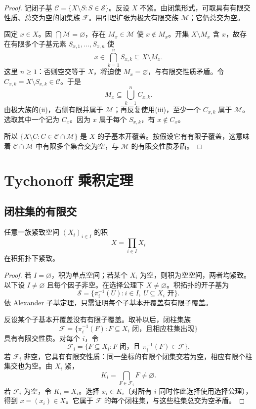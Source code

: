\begin{proof}
记闭子基 \(\mathcal C=\{X\setminus S:S\in\mathcal S\}\)。反设 \(X\) 不紧。由闭集形式，可取具有有限交性质、总交为空的闭集族 \(\mathcal F\)。用引理扩张为极大有限交族 \(\mathcal M\)；它仍总交为空。

固定 \(x\in X\)。因 \(\bigcap\mathcal M=\varnothing\)，存在 \(M_x\in\mathcal M\) 使 \(x\notin M_x\)。开集 \(X\setminus M_x\) 含 \(x\)，故存在有限多个子基元素 \(S_{x,1},\ldots,S_{x,n}\) 使
\[
 x\in\bigcap_{k=1}^nS_{x,k}\subseteq X\setminus M_x.
\]
这里 \(n\ge1\)：否则空交等于 \(X\)，将迫使 \(M_x=\varnothing\)，与有限交性质矛盾。令 \(C_{x,k}=X\setminus S_{x,k}\in\mathcal C\)。于是
\[
 M_x\subseteq\bigcup_{k=1}^nC_{x,k}.
\]
由极大族的(ii)，右侧有限并属于 \(\mathcal M\)；再反复使用(iii)，至少一个 \(C_{x,k}\) 属于 \(\mathcal M\)。选取其中一个记为 \(C_x\)。因为 \(x\) 属于每个 \(S_{x,k}\)，有 \(x\notin C_x\)。

所以 \(\{X\setminus C:C\in\mathcal C\cap\mathcal M\}\) 是 \(X\) 的子基本开覆盖。按假设它有有限子覆盖，这意味着 \(\mathcal C\cap\mathcal M\) 中有限多个集合交为空，与 \(\mathcal M\) 的有限交性质矛盾。
\end{proof}

\section{Tychonoff 乘积定理}

\subsection{闭柱集的有限交}

\begin{theorem}
\label{thm:tychonoff-product}
任意一族紧致空间 \((X_i)_{i\in I}\) 的积
\[
 X=\prod_{i\in I}X_i
\]
在积拓扑下紧致。
\end{theorem}

\begin{proof}
若 \(I=\varnothing\)，积为单点空间；若某个 \(X_i\) 为空，则积为空空间，两者均紧致。以下设 \(I\ne\varnothing\) 且每个因子非空。在选择公理下 \(X\ne\varnothing\)。积拓扑的开子基为
\[
 \mathcal S=\{\pi_i^{-1}(U):i\in I,\ U\subseteq X_i\text{ 开}\}.
\]
依 Alexander 子基定理，只需证明每个子基本开覆盖有有限子覆盖。

反设某个子基本开覆盖没有有限子覆盖。取补以后，闭柱集族
\[
 \mathcal F=\{\pi_i^{-1}(F):F\subseteq X_i\text{ 闭，且相应柱集出现}\}
\]
具有有限交性质。对每个 \(i\)，令
\[
 \mathcal F_i=\{F\subseteq X_i:F\text{ 闭，且 }\pi_i^{-1}(F)\in\mathcal F\}.
\]
若 \(\mathcal F_i\) 非空，它具有有限交性质：同一坐标的有限个闭集交若为空，相应有限个柱集交也为空。由 \(X_i\) 紧，
\[
 K_i=\bigcap_{F\in\mathcal F_i}F\ne\varnothing.
\]
若 \(\mathcal F_i\) 为空，令 \(K_i=X_i\)。选择 \(x_i\in K_i\)（对所有 \(i\) 同时作此选择使用选择公理），得到 \(x=(x_i)\in X\)。它属于 \(\mathcal F\) 的每个闭柱集，与这些柱集总交为空矛盾。
\end{proof}

